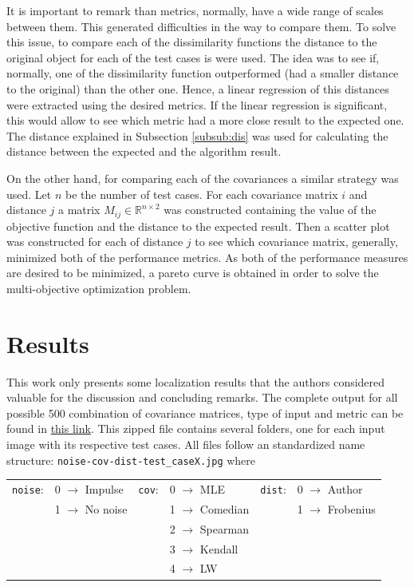 \documentclass[11pt]{article}
\theoremstyle{definition}
\theoremstyle{remark}
\theoremstyle{remark}
\theoremstyle{remark}
\newcommand{\R}{{\mathbb{R}}}
\begin{document}
It is important to remark than metrics, normally, have a wide range of scales between them. This generated difficulties in the way to compare them. To solve this issue, to compare each of the dissimilarity functions the distance to the original object for each of the test cases is were used. The idea was to see if, normally, one of the dissimilarity function outperformed (had a smaller distance to the original) than the other one. Hence, a linear regression of this distances were extracted using the desired metrics. If the linear regression is significant, this would allow to see which metric had a more close result to the expected one. The distance explained in Subsection \ref{subsub:dis} was used for calculating the distance between the expected and the algorithm result.

On the other hand, for comparing each of the covariances a similar strategy was used. Let $n$ be the number of test cases. For each covariance matrix $i$ and distance $j$ a matrix $M_{ij} \in \R^{n\times2}$ was constructed containing the value of the objective function and the distance to the expected result. Then a scatter plot was constructed for each of distance $j$ to see which covariance matrix, generally, minimized both of the performance metrics. As both of the performance measures are desired to be minimized, a pareto curve is obtained in order to solve the multi-objective optimization problem.

\section{Results}\label{sec:res}
This work only presents some localization results that the authors considered valuable for the discussion and concluding remarks. The complete output for all possible 500 combination of covariance matrices, type of input and metric can be found in \href{https://bit.ly/2VMkvne}{this link}. This zipped file contains several folders, one for each input image with its respective test cases. All files follow an standardized name structure: \texttt{noise-cov-dist-test\_caseX.jpg} where

\begin{table}[H]
\centering
\begin{tabular}{llllll}
\texttt{noise}: & 0 $\rightarrow$ Impulse  & \texttt{cov}: & 0 $\rightarrow$ MLE      & \texttt{dist}: & 0 $\rightarrow$ Author    \\
                & 1 $\rightarrow$ No noise &               & 1 $\rightarrow$ Comedian &                & 1 $\rightarrow$ Frobenius \\
                &                          &               & 2 $\rightarrow$ Spearman &                &                           \\
                &                          &               & 3 $\rightarrow$ Kendall  &                &                           \\
                &                          &               & 4 $\rightarrow$ LW       &                &                          
\end{tabular}
\end{table}
\end{document}
